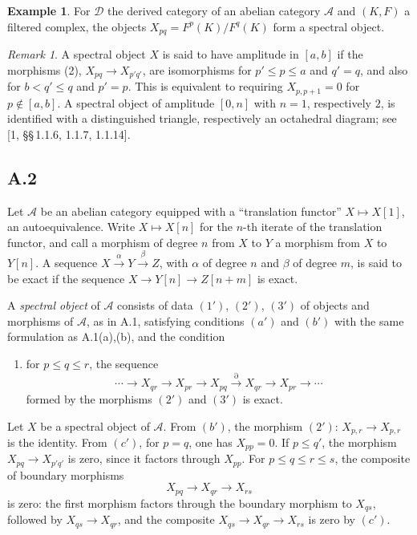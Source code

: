 \documentclass[11pt,a4paper]{article}
\theoremstyle{plain}
\theoremstyle{definition}
\newtheorem{example}[theorem]{Example}
\theoremstyle{remark}
\newtheorem{remark}[theorem]{Remark}
\newcommand{\cD}{\mathscr{D}}
\newcommand{\cA}{\mathscr{A}}
\begin{document}
\begin{example}
For $\cD$ the derived category of an abelian category $\cA$ and $(K,F)$ a filtered complex, the objects $X_{pq}=F^p(K)/F^q(K)$ form a spectral object.
\end{example}

\begin{remark}
A spectral object $X$ is said to have amplitude in $[a,b]$ if the morphisms (2), $X_{pq}\to X_{p'q'}$, are isomorphisms for $p'\leqslant p\leqslant a$ and $q'=q$, and also for $b<q'\leqslant q$ and $p'=p$. This is equivalent to requiring $X_{p,p+1}=0$ for $p\notin[a,b]$. A spectral object of amplitude $[0,n]$ with $n=1$, respectively $2$, is identified with a distinguished triangle, respectively an octahedral diagram; see [1, \S\S\,1.1.6, 1.1.7, 1.1.14].
\end{remark}

\subsection*{A.2}
Let $\cA$ be an abelian category equipped with a ``translation functor'' $X\mapsto X[1]$, an autoequivalence. Write $X\mapsto X[n]$ for the $n$-th iterate of the translation functor, and call a morphism of degree $n$ from $X$ to $Y$ a morphism from $X$ to $Y[n]$. A sequence $X\xrightarrow{\alpha}Y\xrightarrow{\beta}Z$, with $\alpha$ of degree $n$ and $\beta$ of degree $m$, is said to be exact if the sequence $X\to Y[n]\to Z[n+m]$ is exact.

A \emph{spectral object} of $\cA$ consists of data $(1')$, $(2')$, $(3')$ of objects and morphisms of $\cA$, as in A.1, satisfying conditions $(a')$ and $(b')$ with the same formulation as A.1(a),(b), and the condition
\begin{enumerate}[label=$(c')$]
\item for $p\leqslant q\leqslant r$, the sequence
\[
\cdots\to X_{qr}\to X_{pr}\to X_{pq}\xrightarrow{\partial}X_{qr}\to X_{pr}\to\cdots
\]
formed by the morphisms $(2')$ and $(3')$ is exact.
\end{enumerate}

Let $X$ be a spectral object of $\cA$. From $(b')$, the morphism $(2')$: $X_{p,r}\to X_{p,r}$ is the identity. From $(c')$, for $p=q$, one has $X_{pp}=0$. If $p\leqslant q'$, the morphism $X_{pq}\to X_{p'q'}$ is zero, since it factors through $X_{pp}$. For $p\leqslant q\leqslant r\leqslant s$, the composite of boundary morphisms
\[
X_{pq}\to X_{qr}\to X_{rs}
\]
is zero: the first morphism factors through the boundary morphism to $X_{qs}$, followed by $X_{qs}\to X_{qr}$, and the composite $X_{qs}\to X_{qr}\to X_{rs}$ is zero by $(c')$.
\end{document}

